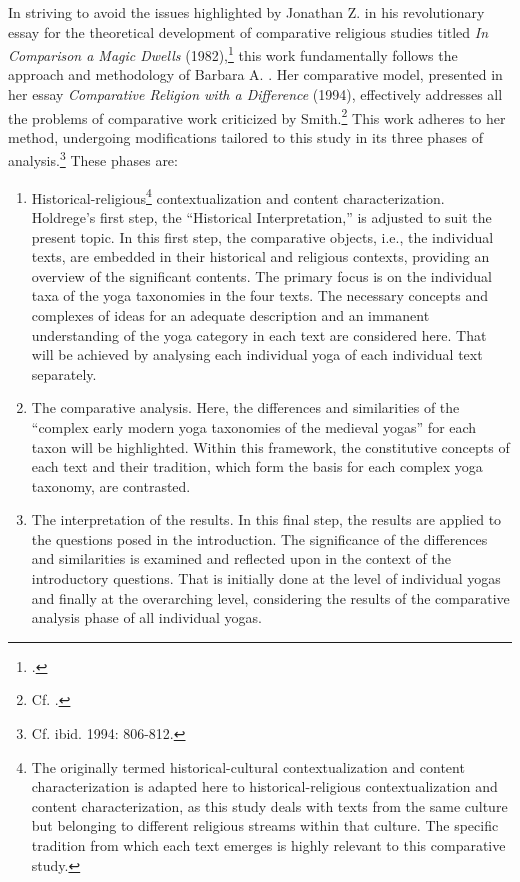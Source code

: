 In striving to avoid the issues highlighted by Jonathan Z. \citeauthor{smith1982} in his revolutionary essay for the theoretical development of comparative religious studies titled \textit{In Comparison a Magic Dwells} (1982),\footnote{\citeauthor[1982]{smith1982}.} this work fundamentally follows the approach and methodology of Barbara A. \citeauthor{holdrege1994}. Her comparative model, presented in her essay \textit{Comparative Religion with a Difference} (1994), effectively addresses all the problems of comparative work criticized by Smith.\footnote{Cf. \citeauthor[1994: 804-805]{holdrege1994}.} This work adheres to her method, undergoing modifications tailored to this study in its three phases of analysis.\footnote{Cf. ibid. 1994: 806-812.} These phases are:
\begin{enumerate}
\item Historical-religious\footnote{The originally termed historical-cultural contextualization and content characterization is adapted here to historical-religious contextualization and content characterization, as this study deals with texts from the same culture but belonging to different religious streams within that culture. The specific tradition from which each text emerges is highly relevant to this comparative study.} contextualization and content characterization. Holdrege's first step, the ``Historical Interpretation,'' is adjusted to suit the present topic. In this first step, the comparative objects, i.e., the individual texts, are embedded in their historical and religious contexts, providing an overview of the significant contents. The primary focus is on the individual taxa of the yoga taxonomies in the four texts. The necessary concepts and complexes of ideas for an adequate description and an immanent understanding of the yoga category in each text are considered here. That will be achieved by analysing each individual yoga of each individual text separately.  

\item The comparative analysis. Here, the differences and similarities of the ``complex early modern yoga taxonomies of the medieval yogas'' for each taxon will be highlighted. Within this framework, the constitutive concepts of each text and their tradition, which form the basis for each complex yoga taxonomy, are contrasted.

\item The interpretation of the results. In this final step, the results are applied to the questions posed in the introduction. The significance of the differences and similarities is examined and reflected upon in the context of the introductory questions. That is initially done at the level of individual yogas and finally at the overarching level, considering the results of the comparative analysis phase of all individual yogas.
\end{enumerate}

